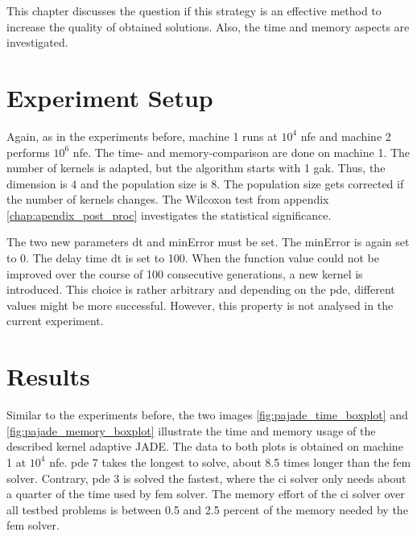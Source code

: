 \documentclass[./\jobname.tex]{subfiles}
\begin{document}
This chapter discusses the question if this strategy is an effective method to increase the quality of obtained solutions. Also, the time and memory aspects are investigated. 

\section{Experiment Setup}

Again, as in the experiments before, machine 1 runs at $10^4$ \gls{nfe} and machine 2 performs $10^6$ \gls{nfe}. The time- and memory-comparison are done on machine 1. The number of kernels is adapted, but the algorithm starts with 1 \gls{gak}. Thus, the dimension is 4 and the population size is 8. The population size gets corrected if the number of kernels changes. The Wilcoxon test from appendix \ref{chap:apendix_post_proc} investigates the statistical significance. 

The two new parameters \gls{dt} and minError must be set. The minError is again set to 0. The delay time \gls{dt} is set to 100. When the function value could not be improved over the course of 100 consecutive generations, a new kernel is introduced. This choice is rather arbitrary and depending on the \gls{pde}, different values might be more successful. However, this property is not analysed in the current experiment.

\section{Results}
\label{chap:results_ex2}

Similar to the experiments before, the two images \ref{fig:pajade_time_boxplot} and \ref{fig:pajade_memory_boxplot} illustrate the time and memory usage of the described kernel adaptive JADE. The data to both plots is obtained on machine 1 at $10^4$ \gls{nfe}. \gls{pde} 7 takes the longest to solve, about 8.5 times longer than the \gls{fem} solver. Contrary, \gls{pde} 3 is solved the fastest, where the \gls{ci} solver only needs about a quarter of the time used by \gls{fem} solver. The memory effort of the \gls{ci} solver over all testbed problems is between 0.5 and 2.5 percent of the memory needed by the \gls{fem} solver. 
\end{document}
